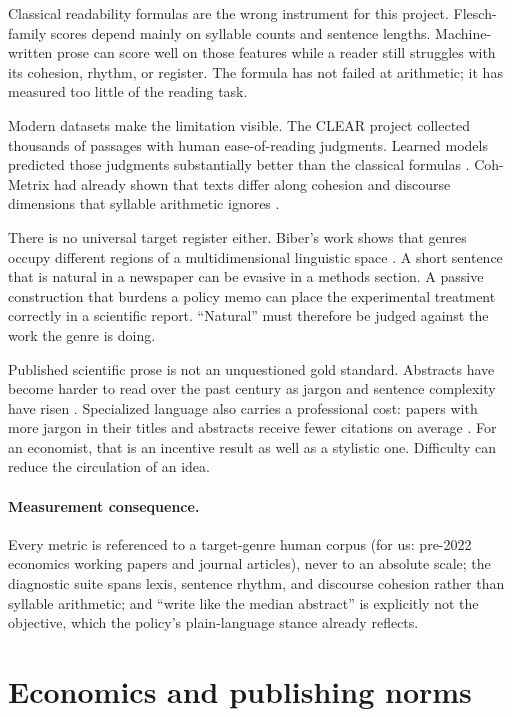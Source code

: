 Classical readability formulas are the wrong instrument for this project.
Flesch-family scores depend mainly on syllable counts and sentence lengths.
Machine-written prose can score well on those features while a reader still
struggles with its cohesion, rhythm, or register. The formula has not failed at
arithmetic; it has measured too little of the reading task.

Modern datasets make the limitation visible. The CLEAR project collected
thousands of passages with human ease-of-reading judgments. Learned models
predicted those judgments substantially better than the classical formulas
\citep{crossley2022clear}. Coh-Metrix had already shown that texts differ along
cohesion and discourse dimensions that syllable arithmetic ignores
\citep{graesser2004cohmetrix}.

There is no universal target register either. Biber's work shows that genres
occupy different regions of a multidimensional linguistic space
\citep{biber1988variation}. A short sentence that is natural in a newspaper can
be evasive in a methods section. A passive construction that burdens a policy
memo can place the experimental treatment correctly in a scientific report.
``Natural'' must therefore be judged against the work the genre is doing.

Published scientific prose is not an unquestioned gold standard. Abstracts
have become harder to read over the past century as jargon and sentence
complexity have risen \citep{plavensigray2017readability}. Specialized language
also carries a professional cost: papers with more jargon in their titles and
abstracts receive fewer citations on average
\citep{martinez2021terminology}. For an economist, that is an incentive result
as well as a stylistic one. Difficulty can reduce the circulation of an idea.

\paragraph{Measurement consequence.} Every \hv{} metric is referenced
to a target-genre human corpus (for us: pre-2022 economics working papers
and journal articles), never to an absolute scale; the diagnostic suite
spans lexis, sentence rhythm, and discourse cohesion rather than syllable
arithmetic; and ``write like the median abstract'' is explicitly not the
objective, which the policy's plain-language stance already reflects.

\section{Economics and publishing norms}
\label{sec:lit-econ}


